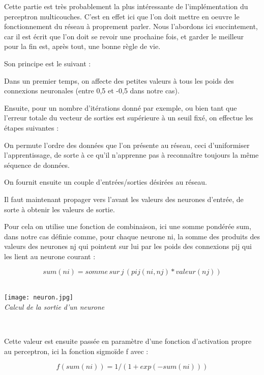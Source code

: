 \documentclass[a4paper,10pt]{report}
\begin{document}
Cette partie est tr\`es probablement la plus int\'eressante de
l'impl\'ementation du perceptron multicouches. C'est en effet ici que
l'on doit mettre en oeuvre le fonctionnement du r\'eseau \`a proprement
parler. Nous l'abordons ici succintement, car il est écrit que l'on doit
se revoir une prochaine fois, et garder le meilleur pour la fin est,
après tout, une bonne règle de vie. 

Son principe est le suivant :

Dans un premier temps, on affecte des petites valeurs \`a tous les poids
des connexions neuronales (entre 0,5 et -0,5 dans notre cas).

Ensuite, pour un nombre d'it\'erations donn\'e par exemple, ou bien tant
que l'erreur totale du vecteur de sorties est supérieure à un seuil fixé, on effectue
les \'etapes suivantes :

On permute l'ordre des donn\'ees que l'on pr\'esente au r\'eseau, ceci
d'uniformiser l'apprentissage, de sorte \`a ce qu'il n'apprenne pas \`a reconna\^itre toujours la m\^eme
s\'equence de donn\'ees.

On fournit ensuite un couple d'entr\'ees/sorties d\'esir\'ees au
r\'eseau.

Il faut maintenant propager vers l'avant les valeurs des neurones
d'entr\'ee, de sorte \`a obtenir les valeurs de sortie.

Pour cela on utilise une fonction de combinaison, ici une somme
pond\'er\'ee sum, dans notre cas
d\'efinie comme, pour chaque neurone ni, la somme des produits des valeurs
des neurones nj qui pointent sur lui par les poids des connexions pij qui les
lient au neurone courant :

\[sum(ni) = somme\, sur\, j\, (pij(ni,nj)* valeur(nj))
\]%
\\

\begin{center}
	
	\texttt{[image: neuron.jpg]}\\
	\caption{\emph{Calcul de la sortie d'un neurone}}\\
\end{center}




Cette valeur est ensuite pass\'ee en param\`etre d'une fonction
d'activation propre au perceptron, ici la fonction sigmo\"ide f avec :  

\[f(sum(ni)) = 1/(1+exp(-sum(ni))) 
\]%
\end{document}
